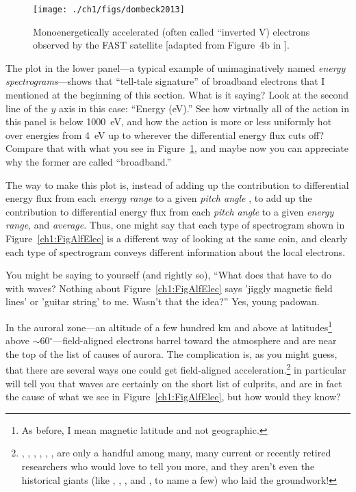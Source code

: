 
\begin{figure}
  \centering
  \noindent\texttt{[image: ./ch1/figs/dombeck2013]}
  \caption[Inverted V (monoenergetic) electrons]{Monoenergetically
    accelerated (often called ``inverted V) electrons observed by
    the FAST satellite [adapted from Figure~4b in \citet{Dombeck2013}].}
  \label{ch1:FigDombeck}
\end{figure}


The plot in the lower panel---a typical example of unimaginatively
named \emph{energy spectrograms}---shows that ``tell-tale signature''
of broadband electrons that I mentioned at the beginning of this
section. What is it saying? Look at the second line of the $y$ axis in
this case: ``Energy (eV).'' See how virtually all of the action in
this panel is below 1000~eV, and how the action is more or less
uniformly hot over energies from 4~eV up to wherever the differential
energy flux cuts off? Compare that with what you see in
Figure~\ref{ch1:FigDombeck}, and maybe now you can appreciate why the
former are called ``broadband.'' 

The way to make this plot is, instead of adding up the contribution to
differential energy flux from each \emph{energy range} to a given
\emph{pitch angle} , to add up the contribution to differential energy
flux from each \emph{pitch angle} to a given \emph{energy range}, and
\emph{average}. Thus, one might say that each type of spectrogram
shown in Figure~\ref{ch1:FigAlfElec} is a different way of looking at
the same coin, and clearly each type of spectrogram conveys different
information about the local electrons.

You might be saying to yourself (and rightly so), ``What does that
have to do with \Alf waves? Nothing about Figure~\ref{ch1:FigAlfElec}
says 'jiggly magnetic field lines' or 'guitar string' to me. Wasn't
that the idea?'' Yes, young padowan. 

In the auroral zone---an altitude of a few hundred km and above at
latitudes\footnote{As before, I mean magnetic latitude and not
  geographic.}  above $\sim$60$^\circ$---field-aligned electrons
barrel toward the atmosphere and are near the top of the list of
causes of aurora. The complication is, as you might guess, that there
are several ways one could get field-aligned
acceleration.\footnote{\citet{Wygant2002}, \citet{Bostrom2003a},
  \citet{Morooka2004}, \citet{Newell2009}, \citet{Hull2010},
  \citet{Mottez2016}, are only a handful among many, many current or
  recently retired researchers who would love to tell you more, and
  they aren't even the historical giants (like \citet{Knight1973},
  \citet{Evans1974}, \citet{Hasegawa1976}, and \citet{Lyons1980a}, to
  name a few) who laid the groundwork!}
\citet{Chaston2002,Chaston2003a,Chaston2007,Chaston2008} in particular
will tell you that \Alf waves are certainly on the short list of
culprits, and are in fact the cause of what we see in
Figure~\ref{ch1:FigAlfElec}, but how would they know?

